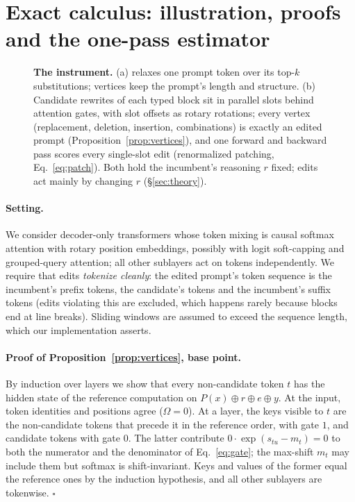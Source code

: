 \section{Exact calculus: illustration, proofs and the one-pass estimator}
\label{app:proofs}

\begin{figure}[h]
\centering
\resizebox{\textwidth}{!}{}
\caption{\textbf{The instrument.} (a) \greater{} relaxes one prompt token over its top-$k$
substitutions; vertices keep the prompt's length and structure. (b) Candidate rewrites of each typed
block sit in parallel slots behind attention gates, with slot offsets as rotary rotations; every
vertex (replacement, deletion, insertion, combinations) is exactly an edited prompt
(Proposition~\ref{prop:vertices}), and one forward and backward pass scores every single-slot edit
(renormalized patching, Eq.~\ref{eq:patch}). Both hold the incumbent's reasoning $r$ fixed; edits
act mainly by changing $r$ (\S\ref{sec:theory}).}
\label{fig:overview}
\end{figure}

\paragraph{Setting.} We consider decoder-only transformers whose token mixing is
causal softmax attention with rotary position embeddings, possibly with logit
soft-capping and grouped-query attention; all other sublayers act on tokens
independently. We require that edits \emph{tokenize cleanly}: the edited prompt's
token sequence is the incumbent's prefix tokens, the candidate's tokens and the
incumbent's suffix tokens (edits violating this are excluded, which happens rarely
because blocks end at line breaks). Sliding windows are assumed to exceed the
sequence length, which our implementation asserts.

\paragraph{Proof of Proposition~\ref{prop:vertices}, base point.} By induction over layers we show that every
non-candidate token $t$ has the hidden state of the reference computation on
$P(x)\oplus r\oplus e\oplus y$. At the input, token identities and positions agree
($\Omega=0$). At a layer, the keys visible to $t$ are the non-candidate tokens that
precede it in the reference order, with gate $1$, and candidate tokens with gate
$0$. The latter contribute $0\cdot\exp(s_{tu}-m_t)=0$ to both the numerator and the
denominator of Eq.~\ref{eq:gate}; the max-shift $m_t$ may include them but softmax
is shift-invariant. Keys and values of the former equal the reference ones by the
induction hypothesis, and all other sublayers are tokenwise. \hfill$\square$

